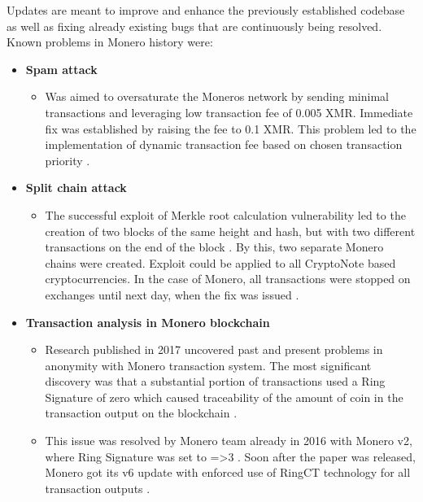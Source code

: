 \documentclass[
  printed, %
  table,   %
  nolof,     %
  nolot,     %
           oneside, color
]{fithesis3}
\begin{document}
Updates are meant to improve and enhance the previously established codebase as well as fixing already existing bugs that are continuously being resolved. Known problems in Monero history were:

\begin{itemize}
\item \textbf{Spam attack}
\begin{itemize}
\item Was aimed to oversaturate the Moneros network by sending minimal transactions and leveraging low transaction fee of 0.005 XMR. Immediate fix was established by raising the fee to 0.1 XMR. This problem led to the implementation of dynamic transaction fee based on chosen transaction priority \cite{monerospamattack}.
\end{itemize}
\item \textbf{Split chain attack}
\begin{itemize}
\item The successful exploit of Merkle root calculation vulnerability led to the creation of two blocks of the same height and hash, but with two different transactions on the end of the block \cite{macheta2014counterfeiting}. By this, two separate Monero chains were created. Exploit could be applied to all CryptoNote based cryptocurrencies. In the case of Monero, all transactions were stopped on exchanges until next day, when the fix was issued \cite{cryptonotemerkletree}.
\end{itemize}
\item \textbf{Transaction analysis in Monero blockchain}
\begin{itemize}
\item Research published in 2017 uncovered past and present problems in anonymity with Monero transaction system. The most significant discovery was that a substantial portion of transactions used a Ring Signature of zero which caused traceability of the amount of coin in the transaction output on the blockchain \cite{moser2018empirical}.
\item This issue was resolved by Monero team already in 2016 with Monero v2, where Ring Signature was set to =>3 \cite{monerov2release}. Soon after the paper was released, Monero got its v6 update with enforced use of RingCT technology for all transaction outputs \cite{monerov6release}.
\end{itemize}
\end{itemize}
\newpage
\end{document}
